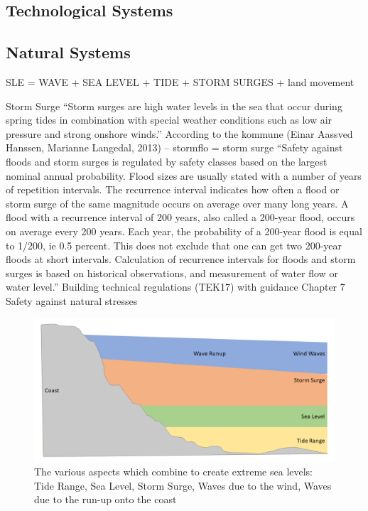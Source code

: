 \subsection{Technological Systems}



\subsection{Natural Systems }
SLE = WAVE + SEA LEVEL + TIDE + STORM SURGES + land movement

Storm Surge
“Storm surges are high water levels in the sea that occur during spring tides in combination with special weather conditions such as low air pressure and strong onshore winds.” According to the kommune (Einar Aassved Hanssen, Marianne Langedal, 2013) – stormflo = storm surge
“Safety against floods and storm surges is regulated by safety classes based on the
largest nominal annual probability. Flood sizes are usually stated with a number of
years of repetition intervals. The recurrence interval indicates how often a flood or
storm surge of the same magnitude occurs on average over many long years. A flood
with a recurrence interval of 200 years, also called a 200-year flood, occurs on average
every 200 years. Each year, the probability of a 200-year flood is equal to 1/200, ie 0.5 percent.
This does not exclude that one can get two 200-year floods at short intervals.
Calculation of recurrence intervals for floods and storm surges is based on historical
observations, and measurement of water flow or water level.”
Building technical regulations (TEK17) with guidance Chapter 7 Safety against natural stresses

\begin{figure}[h]
    \centering
    \includegraphics[width=1\textwidth]{fig_theory/sea level extremes.png}

    \caption{The various aspects which combine to create extreme sea levels: Tide Range, Sea Level, Storm Surge, Waves due to the wind, Waves due to the run-up onto the coast}
    \label{fig:my_label}
\end{figure}


